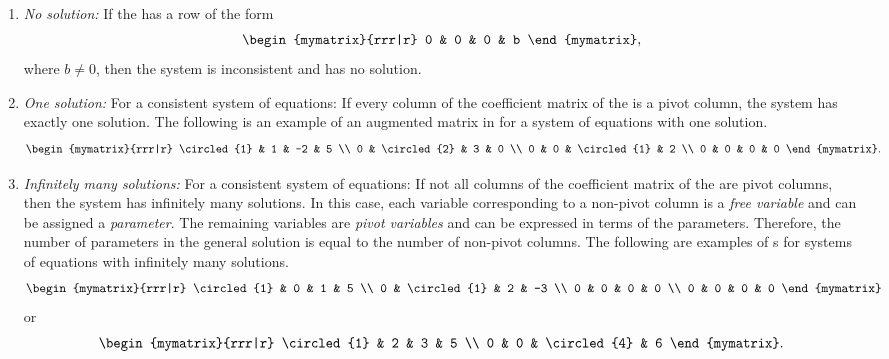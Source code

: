 \begin{enumerate}
\item {\em No solution:} If the {\ef} has a row of the form
  \begin{equation*}
    \begin{mymatrix}{rrr|r}
      0 & 0 & 0 & b
    \end{mymatrix},
  \end{equation*}
  where $b\neq 0$, then the system is inconsistent and has no
  solution.

\item {\em One solution:} For a consistent system of equations: If
  every column of the coefficient matrix of the {\ef} is a pivot
  column, the system has exactly one solution. The following is an
  example of an augmented matrix in {\ef} for a system of equations
  with one solution.
  \begin{equation*}
    \begin{mymatrix}{rrr|r}
      \circled{1} & 1 & -2 & 5 \\
      0 & \circled{2} & 3 & 0 \\
      0 & 0 & \circled{1} & 2 \\
      0 & 0 & 0 & 0
    \end{mymatrix}.
  \end{equation*}

\item {\em Infinitely many solutions:} For a consistent system of
  equations: If not all columns of the coefficient matrix of the {\ef}
  are pivot columns, then the system has infinitely many solutions.
  In this case, each variable corresponding to a non-pivot column is a
  {\em free variable} and
  can be assigned a {\em parameter}. The remaining
  variables are
  {\em pivot variables}
  and can be expressed in terms of the parameters. Therefore, the
  number of parameters in the general solution is equal to the number
  of non-pivot columns.
  The following are examples of {\ef}s for systems of equations with
  infinitely many solutions.
  \begin{equation*}
    \begin{mymatrix}{rrr|r}
      \circled{1} & 0 & 1 & 5 \\
      0 & \circled{1} & 2 & -3 \\
      0 & 0 & 0 & 0 \\
      0 & 0 & 0 & 0
    \end{mymatrix}
  \end{equation*}
  or
  \begin{equation*}
    \begin{mymatrix}{rrr|r}
      \circled{1} & 2 & 3 & 5 \\
      0 & 0 & \circled{4} & 6
    \end{mymatrix}.
\end{equation*}
\end{enumerate}

